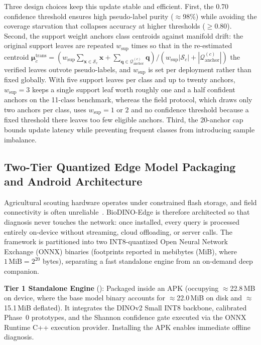 \documentclass[preprint,12pt]{elsarticle}
\begin{document}
Three design choices keep this update stable and efficient. First, the 0.70 confidence threshold ensures high pseudo-label purity ($\approx$98\%) while avoiding the coverage starvation that collapses accuracy at higher thresholds ($\ge$0.80). Second, the support weight anchors class centroids against manifold drift: the original support leaves are repeated $w_{\mathrm{sup}}$ times so that in the re-estimated centroid
$\boldsymbol{\mu}_c^{\text{trans}} = (w_{\mathrm{sup}}\sum_{\mathbf{x}\in\mathcal{S}_c}\mathbf{x} + \sum_{\mathbf{q}\in\mathcal{Q}_{\text{anchor}}^{(c)}}\mathbf{q}) / (w_{\mathrm{sup}}|\mathcal{S}_c| + |\mathcal{Q}_{\text{anchor}}^{(c)}|)$
the verified leaves outvote pseudo-labels, and $w_{\mathrm{sup}}$ is set per deployment rather than fixed globally. With five support leaves per class and up to twenty anchors, $w_{\mathrm{sup}}=3$ keeps a single support leaf worth roughly one and a half confident anchors on the 11-class benchmark, whereas the field protocol, which draws only two anchors per class, uses $w_{\mathrm{sup}}=1$ or $2$ and no confidence threshold because a fixed threshold there leaves too few eligible anchors. Third, the 20-anchor cap bounds update latency while preventing frequent classes from introducing sample imbalance.

\subsection{Two-Tier Quantized Edge Model Packaging and Android Architecture}
\label{sec:packaging}
Agricultural scouting hardware operates under constrained flash storage, and field connectivity is often unreliable~\cite{shoaib2023advanced, sharif2026real}. BioDINO-Edge is therefore architected so that diagnosis never touches the network: once installed, every query is processed entirely on-device without streaming, cloud offloading, or server calls. The framework is partitioned into two INT8-quantized Open Neural Network Exchange (ONNX) binaries (footprints reported in mebibytes (MiB), where $1\,\text{MiB} = 2^{20}$ bytes), separating a fast standalone engine from an on-demand deep companion.

\textbf{Tier 1 Standalone Engine} (): Packaged inside an APK (occupying $\approx$22.8\,MB on device, where the base model binary accounts for $\approx$22.0\,MiB on disk and $\approx$15.1\,MiB deflated). It integrates the DINOv2 Small INT8 backbone, calibrated Phase~0 prototypes, and the Shannon confidence gate executed via the ONNX Runtime C++ execution provider. Installing the APK enables immediate offline diagnosis.
\end{document}
